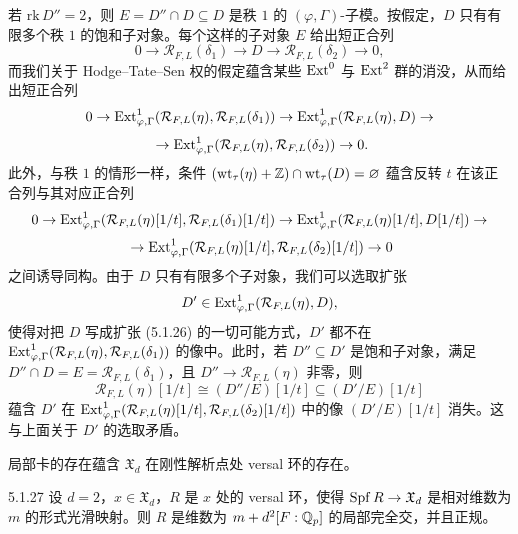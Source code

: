 若 $\mathrm{rk}\,D''=2$，则 $E=D''\cap D\subseteq D$ 是秩 $1$ 的 $(\varphi,\Gamma)$-子模。按假定，$D$ 只有有限多个秩 $1$ 的饱和子对象。每个这样的子对象 $E$ 给出短正合列
\begin{equation}
0\longrightarrow\mathcal{R}_{F,L}(\delta_1)\longrightarrow D\longrightarrow\mathcal{R}_{F,L}(\delta_2)\longrightarrow0,\tag{5.1.26}
\end{equation}
而我们关于 Hodge--Tate--Sen 权的假定蕴含某些 $\operatorname{Ext}^0$ 与 $\operatorname{Ext}^2$ 群的消没，从而给出短正合列
\[
0\to\operatorname{Ext}^1_{\varphi,\Gamma}(\mathcal{R}_{F,L}(\eta),\mathcal{R}_{F,L}(\delta_1))\to\operatorname{Ext}^1_{\varphi,\Gamma}(\mathcal{R}_{F,L}(\eta),D)\to
\]
\[
{}\to\operatorname{Ext}^1_{\varphi,\Gamma}(\mathcal{R}_{F,L}(\eta),\mathcal{R}_{F,L}(\delta_2))\to0.
\]
此外，与秩 $1$ 的情形一样，条件 $(\mathrm{wt}_\tau(\eta)+\mathbb{Z})\cap\mathrm{wt}_\tau(D)=\varnothing$ 蕴含反转 $t$ 在该正合列与其对应正合列
\[
0\to\operatorname{Ext}^1_{\varphi,\Gamma}(\mathcal{R}_{F,L}(\eta)[1/t],\mathcal{R}_{F,L}(\delta_1)[1/t])\to\operatorname{Ext}^1_{\varphi,\Gamma}(\mathcal{R}_{F,L}(\eta)[1/t],D[1/t])\to
\]
\[
{}\to\operatorname{Ext}^1_{\varphi,\Gamma}(\mathcal{R}_{F,L}(\eta)[1/t],\mathcal{R}_{F,L}(\delta_2)[1/t])\to0
\]
之间诱导同构。由于 $D$ 只有有限多个子对象，我们可以选取扩张
\[
D'\in\operatorname{Ext}^1_{\varphi,\Gamma}(\mathcal{R}_{F,L}(\eta),D),
\]
使得对把 $D$ 写成扩张 (5.1.26) 的一切可能方式，$D'$ 都不在 $\operatorname{Ext}^1_{\varphi,\Gamma}(\mathcal{R}_{F,L}(\eta),\mathcal{R}_{F,L}(\delta_1))$ 的像中。此时，若 $D''\subseteq D'$ 是饱和子对象，满足 $D''\cap D=E=\mathcal{R}_{F,L}(\delta_1)$，且 $D''\to\mathcal{R}_{F,L}(\eta)$ 非零，则
\[
\mathcal{R}_{F,L}(\eta)[1/t]\cong(D''/E)[1/t]\subseteq(D'/E)[1/t]
\]
蕴含 $D'$ 在 $\operatorname{Ext}^1_{\varphi,\Gamma}(\mathcal{R}_{F,L}(\eta)[1/t],\mathcal{R}_{F,L}(\delta_2)[1/t])$ 中的像 $(D'/E)[1/t]$ 消失。这与上面关于 $D'$ 的选取矛盾。

局部卡的存在蕴含 $\mathfrak{X}_d$ 在刚性解析点处 versal 环的存在。

\begin{prop}{5.1.27}\label{prop:a4-5-1-27}
设 $d=2$，$x\in\mathfrak{X}_d$，$R$ 是 $x$ 处的 versal 环，使得 $\operatorname{Spf} R\to\mathfrak{X}_d$ 是相对维数为 $m$ 的形式光滑映射。则 $R$ 是维数为 $m+d^2[F:\mathbb{Q}_p]$ 的局部完全交，并且正规。
\end{prop}

